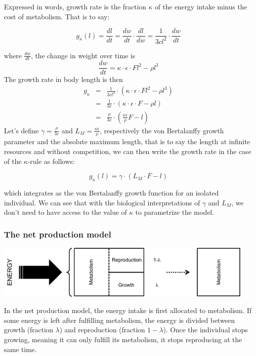 Expressed in words, growth rate is the fraction $\kappa$ of the energy
intake minus the cost of metabolism. That is to say:

\[
g_{\kappa}(l)=\frac{dl}{dt}=\frac{dw}{dt}\cdot\frac{dl}{dw}=\frac{1}{3cl^{2}}\cdot\frac{dw}{dt}
\]


where $\frac{dw}{dt}$, the change in weight over time is 
\[
\frac{dw}{dt}=\kappa\cdot\epsilon\cdot Fl^{2}-\rho l^{3}
\]
The growth rate in body length is then 
\begin{eqnarray*}
g_{\kappa} & = & \frac{1}{3cl^{2}}\cdot\left(\kappa\cdot\epsilon\cdot Fl^{2}-\rho l^{3}\right)\\
 & = & \frac{1}{3c}\cdot\left(\kappa\cdot\epsilon\cdot F-\rho l\right)\\
 & = & \frac{\rho}{3c}\cdot\left(\frac{\kappa\epsilon}{\rho}F-l\right)
\end{eqnarray*}
Let's define ${\displaystyle \gamma=\frac{\rho}{3c}}$ and ${\displaystyle L_{M}=\frac{\kappa\epsilon}{\rho}}$,
respectively the von Bertalanffy growth parameter and the absolute
maximum length, that is to say the length at infinite resources and
without competition, we can then write the growth rate in the case
of the $\kappa$-rule as follows:

\[
g_{\kappa}(l)=\gamma\cdot\left(L_{M}\cdot F-l\right)
\]


which integrates as the von Bertalanffy growth function for an isolated
individual. We can see that with the biological interpretations of
$\gamma$ and $L_{M}$, we don't need to have access to the value
of $\kappa$ to parametrize the model.


\subsubsection{The net production model}

\includegraphics[width=0.95\textwidth]{4_ChapThe1/Fig/NPRule}

In the net production model, the energy intake is first allocated
to metabolism. If some energy is left after fulfilling metabolism,
the energy is divided between growth (fraction $\lambda$) and reproduction
(fraction $1-\lambda$). Once the individual stops growing, meaning
it can only fulfill its metabolism, it stops reproducing at the same
time.


